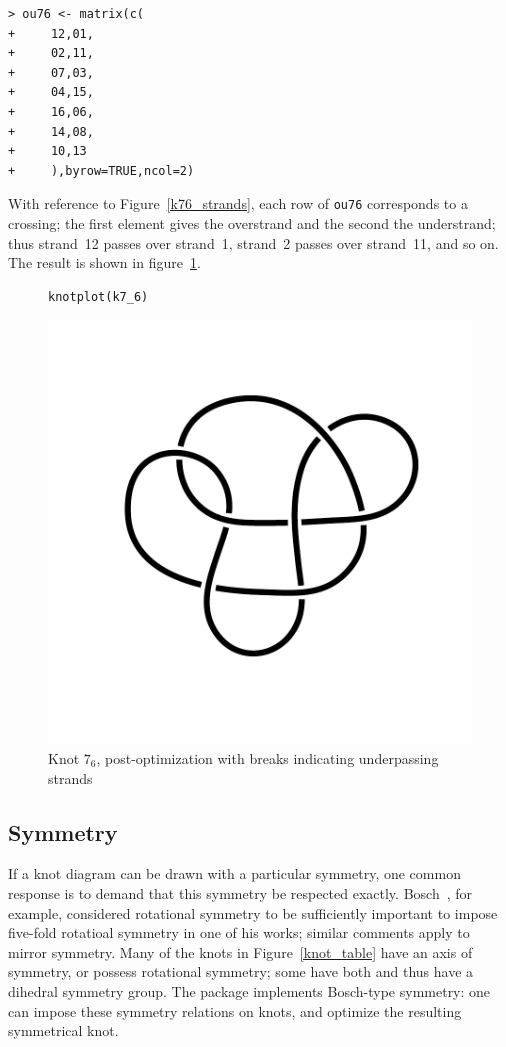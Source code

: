 \documentclass{birkjour}
\theoremstyle{definition}
\theoremstyle{remark}
\numberwithin{equation}{section}
\begin{document}
\begin{verbatim}
> ou76 <- matrix(c(
+     12,01,
+     02,11,
+     07,03,
+     04,15,
+     16,06,
+     14,08,
+     10,13
+     ),byrow=TRUE,ncol=2)
\end{verbatim}

With reference to Figure~\ref{k76_strands}, each row of {\tt ou76}
corresponds to a crossing; the first element gives the overstrand and
the second the understrand; thus strand~12 passes over strand~1,
strand~2 passes over strand~11, and so on. The result is shown in
figure~\ref{76_overunder}.

  
\begin{figure}[!tbp]
\begin{verbatim}
knotplot(k7_6)
\end{verbatim}
  \centering
\includegraphics[scale = 0.9]{knot-009}
\caption{Knot $7_6$, post-optimization with breaks indicating
  \label{76_overunder}  underpassing strands}
\end{figure}


\subsection{Symmetry}

If a knot diagram can be drawn with a particular symmetry, one common
response is to demand that this symmetry be respected exactly.
Bosch~\cite{bosch2010}, for example, considered rotational symmetry to
be sufficiently important to impose five-fold rotatioal symmetry in
one of his works; similar comments apply to mirror symmetry.  Many of
the knots in Figure~\ref{knot_table} have an axis of symmetry, or
possess rotational symmetry; some have both and thus have a dihedral
symmetry group.  The package implements Bosch-type symmetry: one can
impose these symmetry relations on knots, and optimize the resulting
symmetrical knot.
\end{document}

